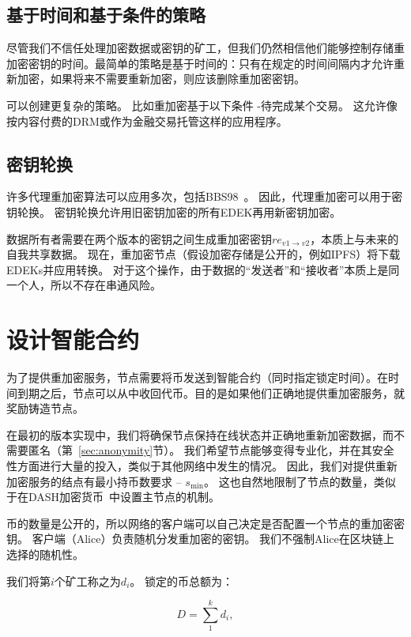 \documentclass[longbibliography,nofootinbib]{revtex4-1}
\begin{document}
\begin{CJK*}{UTF8}{gbsn}
\subsection{基于时间和基于条件的策略}

    尽管我们不信任处理加密数据或密钥的矿工，但我们仍然相信他们能够控制存储重加密密钥的时间。最简单的策略是基于时间的：只有在规定的时间间隔内才允许重新加密，如果将来不需要重新加密，则应该删除重加密密钥。
    
    可以创建更复杂的策略。 比如重加密基于以下条件 -待完成某个交易。 这允许像按内容付费的DRM或作为金融交易托管这样的应用程序。


\subsection{密钥轮换}
\label{sec:key-rotation}

    许多代理重加密算法可以应用多次，包括BBS98~\cite{BBS98}。 因此，代理重加密可以用于密钥轮换。 密钥轮换允许用旧密钥加密的所有EDEK再用新密钥加密。
    
    数据所有者需要在两个版本的密钥之间生成重加密密钥$re_{v1\rightarrow v2}$，本质上与未来的自我共享数据。 现在，重加密节点（假设加密存储是公开的，例如IPFS）将下载EDEKs并应用转换。 对于这个操作，由于数据的“发送者”和“接收者”本质上是同一个人，所以不存在串通风险。

\section{设计智能合约}
\label{sec:smart-contract}

为了提供重加密服务，节点需要将币发送到智能合约（同时指定锁定时间）。在时间到期之后，节点可以从中收回代币。目的是如果他们正确地提供重加密服务，就奖励铸造节点。

    在最初的版本实现中，我们将确保节点保持在线状态并正确地重新加密数据，而不需要匿名（第~\ref{sec:anonymity}节）。 我们希望节点能够变得专业化，并在其安全性方面进行大量的投入，类似于其他网络中发生的情况。 因此，我们对提供重新加密服务的结点有最小持币数要求 – $s_{\min}$。 这也自然地限制了节点的数量，类似于在DASH加密货币~\cite{dash:whitepaper}中设置主节点的机制。
    
    币的数量是公开的，所以网络的客户端可以自己决定是否配置一个节点的重加密密钥。 客户端（Alice）负责随机分发重加密的密钥。 我们不强制Alice在区块链上选择的随机性。
    
    我们将第$i$个矿工称之为$d_i$。 锁定的币总额为：

\begin{equation}
    D = \sum_1^k d_i,
\end{equation}


\end{CJK*}
\end{document}
